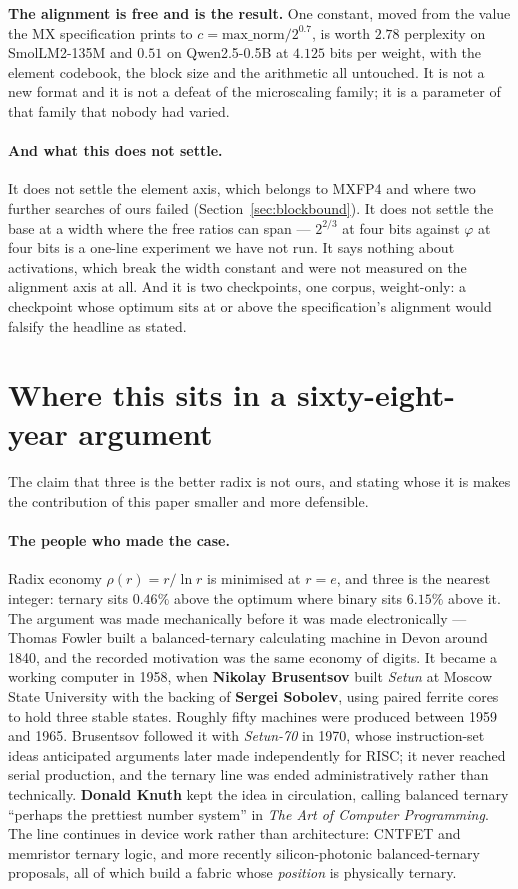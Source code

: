 \documentclass[11pt]{article}
\theoremstyle{definition}
\begin{document}
\textbf{The alignment is free and is the result.} One constant, moved from the
value the MX specification prints to $c = \mathrm{max\_norm}/2^{0.7}$, is worth
$2.78$ perplexity on SmolLM2-135M and $0.51$ on Qwen2.5-0.5B at $4.125$ bits per
weight, with the element codebook, the block size and the arithmetic all
untouched. It is not a new format and it is not a defeat of the microscaling
family; it is a parameter of that family that nobody had varied.

\paragraph{And what this does not settle.} It does not settle the element axis,
which belongs to MXFP4 and where two further searches of ours failed
(Section~\ref{sec:blockbound}). It does not settle the base at a width where the
free ratios can span --- $2^{2/3}$ at four bits against $\varphi$ at four bits is
a one-line experiment we have not run. It says nothing about activations, which
break the width constant and were not measured on the alignment axis at all. And
it is two checkpoints, one corpus, weight-only: a checkpoint whose optimum sits
at or above the specification's alignment would falsify the headline as stated.

\section{Where this sits in a sixty-eight-year argument}
\label{sec:history}

The claim that three is the better radix is not ours, and stating whose it is
makes the contribution of this paper smaller and more defensible.

\paragraph{The people who made the case.} Radix economy $\rho(r) = r/\ln r$ is
minimised at $r = e$, and three is the nearest integer: ternary sits $0.46\%$
above the optimum where binary sits $6.15\%$ above it. The argument was made
mechanically before it was made electronically --- Thomas Fowler built a
balanced-ternary calculating machine in Devon around 1840, and the recorded
motivation was the same economy of digits. It became a working computer in 1958,
when \textbf{Nikolay Brusentsov} built \emph{Setun} at Moscow State University
with the backing of \textbf{Sergei Sobolev}, using paired ferrite cores to hold
three stable states. Roughly fifty machines were produced between 1959 and 1965.
Brusentsov followed it with \emph{Setun-70} in 1970, whose instruction-set ideas
anticipated arguments later made independently for RISC; it never reached serial
production, and the ternary line was ended administratively rather than
technically. \textbf{Donald Knuth} kept the idea in circulation, calling balanced
ternary ``perhaps the prettiest number system'' in \emph{The Art of Computer
Programming}. The line continues in device work rather than architecture: CNTFET
and memristor ternary logic, and more recently silicon-photonic balanced-ternary
proposals, all of which build a fabric whose \emph{position} is physically
ternary.
\end{document}
